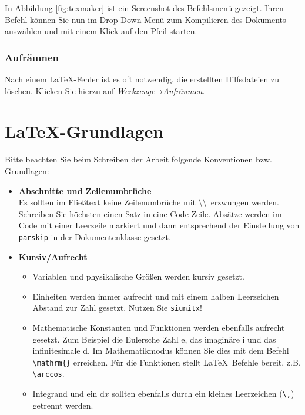 In Abbildung \ref{fig:texmaker} ist ein Screenshot des Befehlsmenü gezeigt. Ihren Befehl können Sie nun im Drop-Down-Menü zum
Kompilieren des Dokuments auswählen und mit einem Klick auf den Pfeil starten.

\subsection{Aufräumen}

Nach einem \LaTeX-Fehler ist es oft notwendig, die erstellten Hilfsdateien zu löschen.
Klicken Sie hierzu auf \emph{Werkzeuge}→\emph{Aufräumen}.


\chapter{\LaTeX-Grundlagen}

Bitte beachten Sie beim Schreiben der Arbeit folgende Konventionen bzw. Grundlagen:

\begin{itemize}
    \item \textbf{Abschnitte und Zeilenumbrüche} \\
        Es sollten im Fließtext keine Zeilenumbrüche mit \textbackslash\textbackslash \ erzwungen werden.
        Schreiben Sie höchsten einen Satz in eine Code-Zeile.
        Absätze werden im Code mit einer Leerzeile markiert und dann entsprechend der Einstellung von \texttt{parskip} in der Dokumentenklasse gesetzt.
    \item \textbf{Kursiv/Aufrecht} \\
        \begin{itemize}
            \item Variablen und physikalische Größen werden kursiv gesetzt.
            \item Einheiten werden immer aufrecht und mit einem halben Leerzeichen Abstand zur Zahl gesetzt. Nutzen Sie \texttt{siunitx}!
            \item Mathematische Konstanten und Funktionen werden ebenfalls aufrecht gesetzt. Zum Beispiel die Eulersche Zahl e, das imaginäre i und das infinitesimale d.
                Im Mathematikmodus können Sie dies mit dem Befehl \verb_\mathrm{}_ erreichen. Für die Funktionen stellt \LaTeX \ Befehle bereit, z.B. \verb+\arccos+.
            \item Integrand und ein $\mathrm{d}x$ sollten ebenfalls durch ein kleines Leerzeichen (\verb+\,+) getrennt werden.
        \end{itemize}



\end{itemize}

